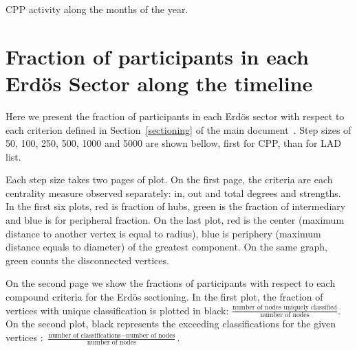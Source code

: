 \documentclass[%
 aip,
 jmp,%
 amsmath,amssymb,
 reprint,%
 floatfix,
]{revtex4-1}
\begin{document}
\begin{table}[!h]
	\caption{CPP activity along the months of the year.}
	\footnotesize
	
\label{tab:min2}
\end{table}



\section{Fraction of participants in each Erd\"os Sector along the timeline}\label{si:frac}
	Here we present the fraction of participants in each Erd\"os sector with respect to each criterion defined in Section~\ref{sectioning} of the main document~\cite{tpaper}. Step sizes of 50, 100, 250, 500, 1000 and 5000 are shown bellow, first for CPP, than for  LAD list.

Each step size takes two pages of plot. On the first page, the criteria are each centrality measure observed separately: in, out and total degrees and strengths. In the first six plots, red is fraction of hubs, green is the fraction of intermediary and blue is for peripheral fraction. On the last plot, red is the center (maximum distance to another vertex is equal to radius), blue is periphery (maximum distance equals to diameter) of the greatest component. On the same graph, green counts the disconnected vertices.

On the second page we show the fractions of participants with respect to each compound criteria for the Erd\"os sectioning. In the first plot, the fraction of vertices with unique classification is plotted in black: $\frac{\text{number of nodes uniquely classified}}{\text{number of nodes}}$. On the second plot, black represents the exceeding classifications for the given vertices : $\frac{\text{number of classifications} - \text{number of nodes}}{\text{number of nodes}}$.
\end{document}

